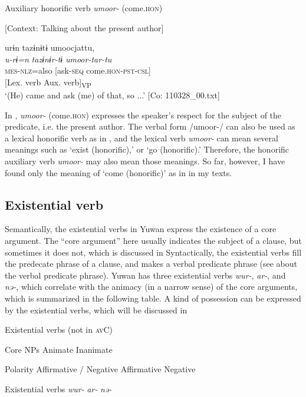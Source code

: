 \ea\label{ex:8-27}
  Auxiliary honorific verb \textit{umoor-} (come.\textsc{hon})

  [Context: Talking about the present author]

 {\US}
\glll   urɨn  tazɨnɨtɨ  umoocjattu,\\
\textit{u-rɨ=n}  \textit{tazɨnɨr-tɨ}  \textit{umoor-tar-tu}\\
    \textsc{mes}-\textsc{nlz}=also  [ask-\textsc{seq}  come.\textsc{hon}-\textsc{pst}-\textsc{csl}]\\
      {}[Lex. verb  Aux. verb]\textsubscript{VP}\\
\glt ‘(He) came and ask (me) of that, so ...’ [Co: 110328\_00.txt]
\z

In , \textit{umoor-} (come.\textsc{hon}) expresses the speaker’s respect for the subject of the predicate, i.e. the present author. The verbal form /umoor-/ can also be used as a lexical honorific verb as in , and the lexical verb \textit{umoor-} can mean several meanings such as ‘exist (honorific),’ or ‘go (honorific).’ Therefore, the honorific auxiliary verb \textit{umoor-} may also mean those meanings. So far, however, I have found only the meaning of ‘come (honorific)’ as in  in my texts.

\subsection{Existential verb}

Semantically, the existential verbs in Yuwan express the existence of a core argument. The “core argument” here usually indicates the subject of a clause, but sometimes it does not, which is discussed in  Syntactically, the existential verbs fill the predecate phrase of a clause, and makes a verbal predicate phrase (see  about the verbal predicate phrase). Yuwan has three existential verbs \textit{wur-}, \textit{ar-}, and \textit{nə-}, which correlate with the animacy (in a narrow sense) of the core arguments, which is summarized in the following table. A kind of possession can be expressed by the existential verbs, which will be discussed in 

\begin{table}
\caption{\label{tab:key:74}Existential verbs (not in \textsc{av}C)}

Core NPs  Animate  Inanimate

Polarity  Affirmative / Negative  Affirmative  Negative

Existential verbs  \textit{wur-}  \textit{ar-}  \textit{nə-}
\end{table}

